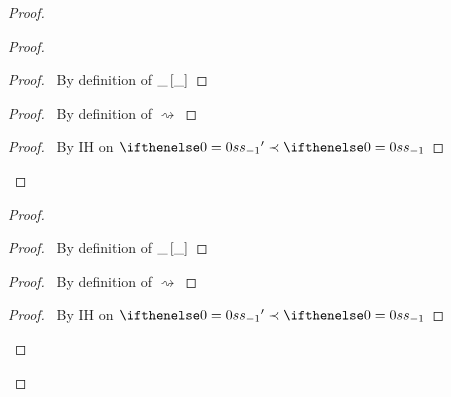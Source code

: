 \documentclass[a4paper]{article}
\begin{document}
\begin{proof}
\begin{proof}
\begin{proof}
      \pf\ By definition of $\_ \left[ \_ \right]$  
    \end{proof}
    \begin{proof}
      \pf\ By definition of $\rightsquigarrow$ 
    \end{proof}
    \qedstep
    \begin{proof}
      \pf\ By IH on $\aStack' \prec \aStack$
    \end{proof}
  \end{proof}
    \begin{proof}
    \begin{proof}
      \pf\ By definition of $\_ \left[ \_ \right]$  
    \end{proof}
    \begin{proof}
      \pf\ By definition of $\rightsquigarrow$ 
    \end{proof}
    \qedstep
    \begin{proof}
      \pf\ By IH on $\aStack' \prec \aStack$
    \end{proof}
  \end{proof}
\end{proof}
\end{document}

